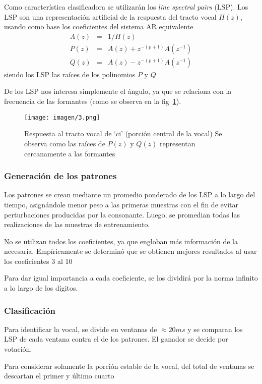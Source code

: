 \documentclass[conference,a4paper,10pt,oneside,final]{tfmpd}
\begin{document}
		Como característica clasificadora se utilizarán los \emph{line spectral pairs} (LSP).
		Los LSP son una representación artificial de la respuesta del tracto vocal $H(z)$,
		usando como base los coeficientes del sistema AR equivalente
		\begin{eqnarray*}
			A(z) &=& 1/H(z) \\
			P(z) &=& A(z) + z^{-(p+1)}A(z^{-1}) \\
			Q(z) &=& A(z) - z^{-(p+1)}A(z^{-1})
		\end{eqnarray*}
		siendo los LSP las raíces de los polinomios $P$ y $Q$ \cite{McLoughlin}

		De los LSP nos interesa simplemente el ángulo, 
		ya que se relaciona con la frecuencia de las formantes 
		(como se observa en la fig~\ref{fig:tracto}).
		\begin{figure}
			\texttt{[image: imagen/3.png]}
			\caption{
				Respuesta al tracto vocal de `ci' (porción central de la vocal)
				Se observa como las raíces de $P(z)$ y $Q(z)$ representan cercanamente a las formantes
			}
			\label{fig:tracto}
		\end{figure}

		\subsubsection{Generación de los patrones}
		Los patrones se crean mediante un promedio ponderado de los LSP
		a lo largo del tiempo, asignándole menor peso a las primeras muestras
		con el fin de evitar perturbaciones producidas por la consonante.
		Luego, se promedian todas las realizaciones de las muestras de entrenamiento.

		No se utilizan todos los coeficientes,
		ya que engloban más información de la necesaria.
		Empíricamente se determinó que se obtienen mejores resultados 
		al usar los coeficientes $3$ al $10$

		Para dar igual importancia a cada coeficiente, se los dividirá por la norma infinito
		a lo largo de los dígitos.
			
		\subsubsection{Clasificación}
		Para identificar la vocal, se divide en ventanas de $\approx 20ms$ y se comparan los
		LSP de cada ventana contra el de los patrones.
		El ganador se decide por votación.


		Para considerar solamente la porción estable de la vocal,
		del total de ventanas se descartan el primer y último cuarto
\end{document}
